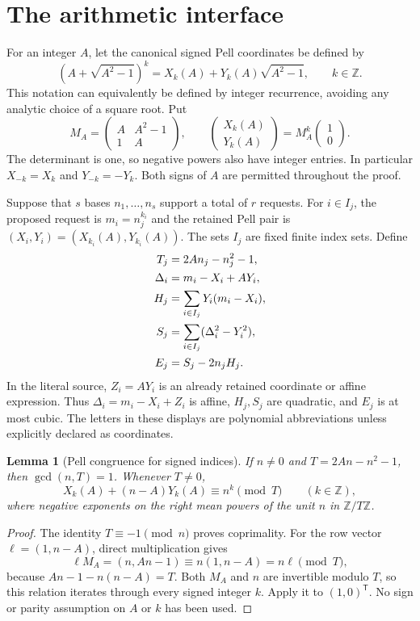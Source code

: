 \documentclass[10pt,letterpaper]{article}
\newtheorem{lemma}[theorem]{Lemma}
\theoremstyle{remark}\newtheorem{remark}[theorem]{Remark}
\newcommand{\Z}{\mathbb Z}\newcommand{\Q}{\mathbb Q}\newcommand{\N}{\mathbb N}
\begin{document}
\section{The arithmetic interface}

For an integer $A$, let the canonical signed Pell coordinates be defined
by
\[
 (A+\sqrt{A^2-1})^k=X_k(A)+Y_k(A)\sqrt{A^2-1},\qquad k\in\Z.
\]
This notation can equivalently be defined by integer recurrence, avoiding
any analytic choice of a square root. Put
\[
 M_A=\begin{pmatrix}A&A^2-1\\1&A\end{pmatrix},\qquad
 \begin{pmatrix}X_k(A)\\Y_k(A)\end{pmatrix}
 =M_A^k\begin{pmatrix}1\\0\end{pmatrix}.
\]
The determinant is one, so negative powers also have integer entries.
In particular $X_{-k}=X_k$ and $Y_{-k}=-Y_k$. Both signs of $A$ are
permitted throughout the proof.

Suppose that $s$ bases $n_1,\ldots,n_s$ support a total of $r$ requests.
For $i\in I_j$, the proposed request is $m_i=n_j^{k_i}$ and the retained
Pell pair is $(X_i,Y_i)=(X_{k_i}(A),Y_{k_i}(A))$. The sets $I_j$ are fixed
finite index sets. Define
\begin{align}
 T_j&=2An_j-n_j^2-1,\label{eq:T}\\
 \Delta_i&=m_i-X_i+AY_i,\notag\\
 H_j&=\sum_{i\in I_j}Y_i(m_i-X_i),\notag\\
 S_j&=\sum_{i\in I_j}(\Delta_i^2-Y_i^2),\notag\\
 E_j&=S_j-2n_jH_j.\label{eq:E}
\end{align}
In the literal source, $Z_i=AY_i$ is an already retained coordinate or
affine expression. Thus $\Delta_i=m_i-X_i+Z_i$ is affine, $H_j,S_j$ are
quadratic, and $E_j$ is at most cubic. The letters in these displays
are polynomial abbreviations unless explicitly declared as coordinates.

\begin{lemma}[Pell congruence for signed indices]\label{lem:pell}
If $n\ne0$ and $T=2An-n^2-1$, then $\gcd(n,T)=1$. Whenever $T\ne0$,
\[
 X_k(A)+(n-A)Y_k(A)\equiv n^k\pmod T\qquad(k\in\Z),
\]
where negative exponents on the right mean powers of the unit $n$
in $\Z/T\Z$.
\end{lemma}
\begin{proof}
The identity $T\equiv-1\pmod n$ proves coprimality. For the row vector
$\ell=(1,n-A)$, direct multiplication gives
\[
 \ell M_A=(n,An-1)\equiv n(1,n-A)=n\ell\pmod T,
\]
because $An-1-n(n-A)=T$. Both $M_A$ and $n$ are invertible modulo
$T$, so this relation iterates through every signed integer $k$.
Apply it to $(1,0)^{\mathsf T}$. No sign or parity assumption on $A$
or $k$ has been used.
\end{proof}
\end{document}
